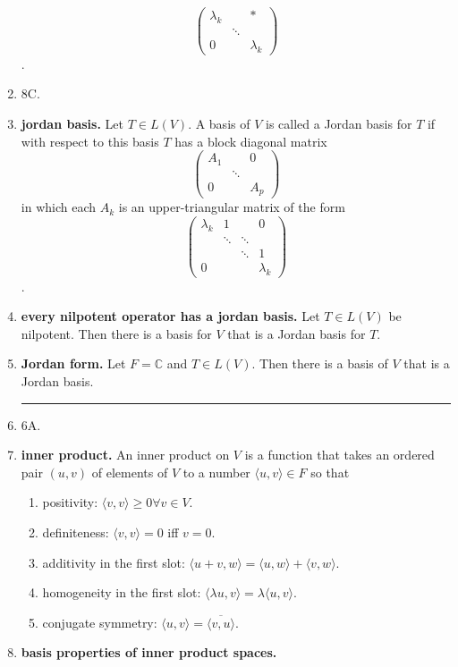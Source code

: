 \begin{enumerate}
$$\begin{pmatrix}
	\lambda_k & & * \\
	 & \ddots &  \\
	0 & & \lambda_k
	\end{pmatrix}
	$$. 
	\item 8C. 
	\item \textbf{jordan basis. } Let $T \in L(V)$. A basis of $V$ is called a Jordan basis for $T$ if with respect to this basis $T$ has a block diagonal matrix 
	$$
	\begin{pmatrix}
	A_1 & & 0 \\
	 & \ddots & \\
	0 & & A_p
	\end{pmatrix}
	$$ in which each $A_k$ is an upper-triangular matrix of the form 
	$$
	\begin{pmatrix}
	\lambda_k & 1 & & 0 \\
	 & \ddots & \ddots & \\
	 & & \ddots & 1 \\
	0 & & & \lambda_k
	\end{pmatrix}
	$$. 
	\item \textbf{every nilpotent operator has a jordan basis. } Let $T \in L(V)$ be nilpotent. Then there is a basis for $V$ that is a Jordan basis for $T$. 
	\item \textbf{Jordan form. } Let $F = \mathbb{C}$ and $T \in L(V)$. Then there is a basis of $V$ that is a Jordan basis. 
	\begin{center}
		\hrule
	\end{center} 
	\item 6A. 
	\item \textbf{inner product. } An inner product on $V$ is a function that takes an ordered pair $(u,v)$ of elements of $V$ to a number $\langle u,v \rangle \in F$ so that 
	\begin{enumerate}
		\item positivity: $\langle v,v \rangle \geq 0 \forall v \in V$. 
		\item definiteness: $\langle v,v \rangle = 0$ iff $v = 0$. 
		\item additivity in the first slot: $\langle u + v,w \rangle = \langle u,w \rangle + \langle v,w \rangle$. 
		\item homogeneity in the first slot: $\langle \lambda u,v \rangle = \lambda \langle u,v \rangle$. 
		\item conjugate symmetry: $\langle u,v \rangle = \overline{\langle v,u \rangle}$.
	\end{enumerate}
	\item \textbf{basis properties of inner product spaces. } 

\end{enumerate}
